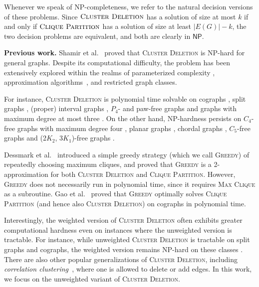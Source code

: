 \documentclass[a4paper,fleqn]{cas-sc}
\theoremstyle{remark}
\theoremstyle{plain}
\newcommand{\cd}{\textsc{Cluster Deletion}}
\newcommand{\cp}{\textsc{Clique Partition}}
\newcommand{\mc}{\textsc{Max Clique}}
\newcommand{\greedy}{{\textsc{Greedy}}}
\begin{document}
 \medskip

\noindent Whenever we speak of NP-completeness, we refer to the natural decision versions of these problems. Since $\cd{}$ has a solution of size at most $k$ if and only if $\cp{}$ has a solution of size at least $|E(G)|-k$, the two decision problems are equivalent, and both are clearly in $\mathsf{NP}$.

\medskip


\noindent \textbf{Previous work.} Shamir et al.~\cite{SHAMIR2004} proved that \cd{} is NP-hard for general graphs.  Despite its computational difficulty, the problem has been extensively explored within the realms of parameterized complexity \cite{gramm2005,damaschke2009,BOCKER2011,GHN13,Bathie2022,italiano2025}, approximation algorithms~\cite{CHARIKAR2005,DESSMARK2007,Puleo2015,veldt2018,veldt2022,balmaseda2024}, and restricted graph classes.  

For instance, \cd{} is polynomial time solvable on cographs \cite{GHN13}, split graphs \cite{BONOMO2015,konstantinidis2021cluster}, (proper) interval graphs \cite{BONOMO2015,konstantinidis2021cluster}, $P_4$- and paw-free graphs \cite{komus2018} and graphs with maximum degree at most three \cite{KOMUSIEWICZ2012}. On the other hand, NP-hardness persists on $C_4$-free graphs with maximum degree four \cite{KOMUSIEWICZ2012}, planar graphs \cite{golovach2018}, chordal graphs \cite{BONOMO2015}, $C_5$-free graphs and (2$K_2$, 3$K_1$)-free graphs \cite{GHN13}. 

Dessmark et al.~\cite{DESSMARK2007} introduced a simple greedy strategy (which we call \greedy)
of repeatedly choosing maximum cliques, and proved that \greedy{} is a 2-approximation for both \cd{} and \cp{}.  However, \greedy{} does not necessarily run in polynomial time, since it requires \mc{} as a subroutine. Gao et al.~\cite{GHN13} proved that \greedy{} optimally solves \cp{} (and hence also \cd) on cographs in polynomial time.  

Interestingly, the weighted version of \cd{} often exhibits greater computational hardness even on instances where the unweighted version is tractable. For instance, while unweighted \cd{} is tractable on split graphs and cographs, the weighted version remains NP-hard on these classes \cite{BONOMO2015}. 
There are also other popular generalizations of \cd{}, including \emph{correlation clustering~}\cite{bansal2004,SHAMIR2004}, where one is allowed to delete or add edges.  In this work, we focus on the unweighted variant of \cd{}.
\end{document}
